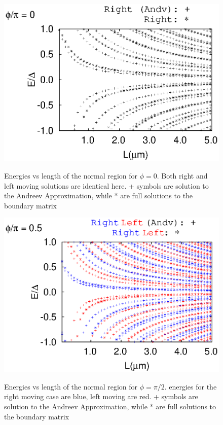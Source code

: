 \documentclass[a4paper,11pt]{article}
\begin{document}
\begin{figure}
  \begin{center}
    \includegraphics{levels_with_L_0pi.eps}
    \label{fig:}
    \caption{Energies vs length of the normal region for $\phi=0$. Both right and left moving solutions are identical here. + symbols are solution to the Andreev Approximation, while * are full solutions to the boundary matrix}
  \end{center}
\end{figure}

\begin{figure}
  \begin{center}
    \includegraphics{levels_with_L_pi2.eps}
    \label{fig:}
    \caption{Energies vs length of the normal region for $\phi=\pi/2$. energies for the right moving case are blue, left moving are red. + symbols are solution to the Andreev Approximation, while * are full solutions to the boundary matrix}
  \end{center}
\end{figure}
\end{document}
